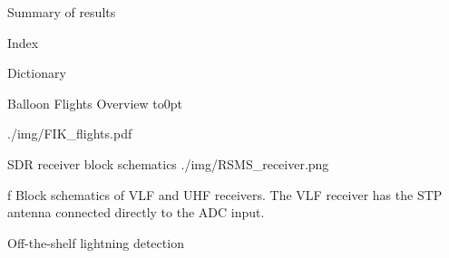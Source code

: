

\chap[results] Summary of results



\app Index
\makeindex

\app Dictionary
\makeglos

 Balloon Flights Overview
\vbox to0pt{\vskip-25mm\centerline{\inspic ./img/FIK_flights.pdf }\vss}
\nextoddpage

 SDR receiver block schematics
\medskip
\picw=8cm \cinspic ./img/RSMS_receiver.png
\caption/f Block schematics of VLF and UHF receivers. The VLF receiver has the STP antenna connected directly to the ADC input.
\medskip

 Off-the-shelf lightning detection

